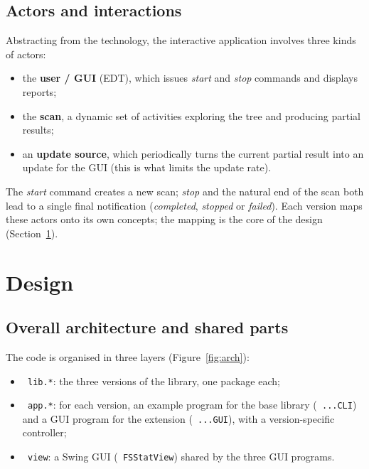 \documentclass[11pt,a4paper]{article}
\newcommand{\code}[1]{\texttt{\hyphenchar\font=-1 #1}}
\begin{document}
\subsection{Actors and interactions}

Abstracting from the technology, the interactive application involves three kinds of actors:
\begin{itemize}
  \item the \textbf{user / GUI} (EDT), which issues \emph{start} and \emph{stop} commands and displays
        reports;
  \item the \textbf{scan}, a dynamic set of activities exploring the tree and producing partial results;
  \item an \textbf{update source}, which periodically turns the current partial result into an update
        for the GUI (this is what limits the update rate).
\end{itemize}
The \emph{start} command creates a new scan; \emph{stop} and the natural end of the scan both lead to a
single final notification (\emph{completed}, \emph{stopped} or \emph{failed}). Each version maps these
actors onto its own concepts; the mapping is the core of the design (Section~\ref{sec:design}).

\section{Design}\label{sec:design}

\subsection{Overall architecture and shared parts}

The code is organised in three layers (Figure~\ref{fig:arch}):
\begin{itemize}
  \item \code{lib.*}: the three versions of the library, one package each;
  \item \code{app.*}: for each version, an example program for the base library (\code{...CLI}) and a
        GUI program for the extension (\code{...GUI}), with a version-specific controller;
  \item \code{view}: a Swing GUI (\code{FSStatView}) shared by the three GUI programs.
\end{itemize}
\end{document}
